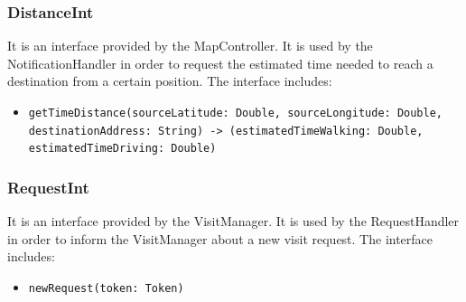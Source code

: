 \documentclass[a4paper,oneside,11pt]{book}
\newcommand{\red}[1]{\begingroup\color{punct}#1\endgroup}
\begin{document}
    \subsubsection{DistanceInt}
    It is an interface provided by the MapController. It is used by the NotificationHandler in order to request the estimated time needed to reach a destination from a certain position. The interface includes:
    \begin{itemize}
       \item \texttt{getTimeDistance(sourceLatitude: \red{Double}, sourceLongitude: \red{Double}, \newline destinationAddress: \red{String}) -> (estimatedTimeWalking: \red{Double}, \newline estimatedTimeDriving: \red{Double})}
   \end{itemize}
    \subsubsection{RequestInt}
    It is an interface provided by the VisitManager. It is used by the RequestHandler in order to inform the VisitManager about a new visit request. The interface includes:
    \begin{itemize}
       \item \texttt{newRequest(token: \red{Token})}
   \end{itemize}
   
\end{document}
